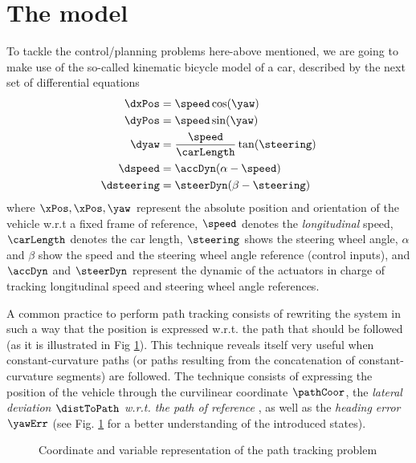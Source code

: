\section{The model}
	To tackle the control/planning problems here-above mentioned, we are going to make use of the so-called kinematic bicycle model of a car, described by the next set of differential equations
	\begin{subequations}
	\begin{align}
		\dxPos 		& = \speed\cos(\yaw) \\
		\dyPos 		& = \speed\sin(\yaw) \\
		\dyaw 		& = \frac{\speed}{\carLength}\tan(\steering) \\
		\dspeed     & = \accDyn(\alpha-\speed)\\
		\dsteering & = \steerDyn(\beta-\steering)
	\end{align}
	\end{subequations}
	where $\xPos, \xPos, \yaw$ represent the absolute position and orientation of the vehicle w.r.t a fixed frame of reference, $\speed$ denotes the \emph{longitudinal} speed, $\carLength$ denotes the car length,  $\steering$ shows the steering wheel angle, $\alpha$ and $\beta$ show the speed and the steering wheel angle reference (control inputs), and $\accDyn$ and $\steerDyn$ represent the dynamic of the actuators in charge of tracking longitudinal speed and steering wheel angle references.\par
	A common practice to perform path tracking consists of rewriting the system in such a way that the position is expressed w.r.t. the path that should be followed (as it is illustrated in Fig \ref{fig:system}).
	This technique reveals itself very useful when constant-curvature paths (or paths resulting from the concatenation of constant-curvature segments) are followed.
	The technique consists of expressing the position of the vehicle through the curvilinear coordinate $\pathCoor$, the \emph{lateral deviation} $\distToPath$ \emph{w.r.t. the path of reference} , as well as the \emph{heading error} $\yawErr$ (see Fig. \ref{fig:system} for a better understanding of the introduced states).\par
	\begin{figure}[!h]
		\centering
		\caption{Coordinate and variable representation of the path tracking problem}
		\label{fig:system}
	\end{figure}	
